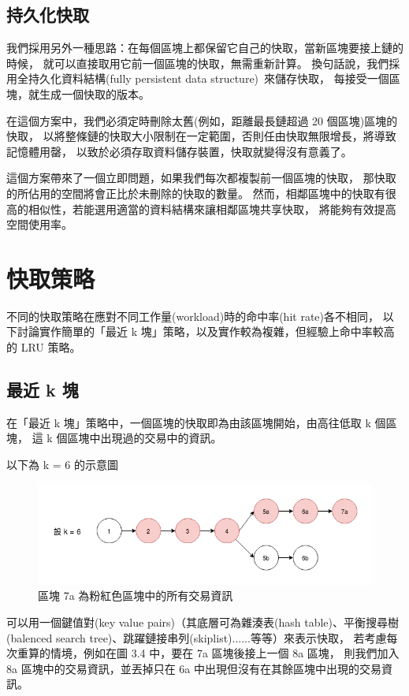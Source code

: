 \subsection{持久化快取}

我們採用另外一種思路：在每個區塊上都保留它自己的快取，當新區塊要接上鏈的時候，
就可以直接取用它前一個區塊的快取，無需重新計算。
換句話說，我們採用全持久化資料結構(fully persistent data structure)~\cite{driscoll1986making}來儲存快取，
每接受一個區塊，就生成一個快取的版本。

在這個方案中，我們必須定時刪除太舊(例如，距離最長鏈超過 20 個區塊)區塊的快取，
以將整條鏈的快取大小限制在一定範圍，否則任由快取無限增長，將導致記憶體用罄，
以致於必須存取資料儲存裝置，快取就變得沒有意義了。

這個方案帶來了一個立即問題，如果我們每次都複製前一個區塊的快取，
那快取的所佔用的空間將會正比於未刪除的快取的數量。
然而，相鄰區塊中的快取有很高的相似性，若能選用適當的資料結構來讓相鄰區塊共享快取，
將能夠有效提高空間使用率。

\section{快取策略}

不同的快取策略在應對不同工作量(workload)時的命中率(hit rate)各不相同，
以下討論實作簡單的「最近 k 塊」策略，以及實作較為複雜，但經驗上命中率較高的 LRU 策略。

\subsection{最近 k 塊}

在「最近 k 塊」策略中，一個區塊的快取即為由該區塊開始，由高往低取 k 個區塊，
這 k 個區塊中出現過的交易中的資訊。

以下為 k = 6 的示意圖

\begin{figure}[h]
\includegraphics[width=\textwidth]{最近k塊}
\caption{區塊 7a 為粉紅色區塊中的所有交易資訊}
\end{figure}

可以用一個鍵值對(key value pairs)（其底層可為雜湊表(hash table)、平衡搜尋樹(balenced search tree)、跳躍鏈接串列\cite{lists1990probabilistic}(skiplist)......等等）來表示快取，
若考慮每次重算的情境，例如在圖 3.4 中，要在 7a 區塊後接上一個 8a 區塊，
則我們加入 8a 區塊中的交易資訊，並丟掉只在 6a 中出現但沒有在其餘區塊中出現的交易資訊。

